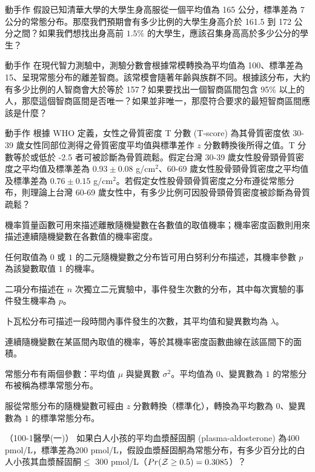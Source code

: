     \answerbox{250pt}

    \bigskip

    \begin{custom}{動手作}
        假設已知清華大學的大學生身高服從一個平均值為 165 公分，標準差為 7 公分的常態分布。那麼我們預期會有多少比例的大學生身高介於 161.5 到 172 公分之間？如果我們想找出身高前 $1.5\%$ 的大學生，應該召集身高高於多少公分的學生？
    \end{custom}
    
    \answerbox{235pt}

    \bigskip

    \begin{custom}{動手作}
        在現代智力測驗中，測驗分數會根據常模轉換為平均值為 100、標準差為 15、呈現常態分布的離差智商。該常模會隨著年齡與族群不同。根據該分布，大約有多少比例的人智商會大於等於 157？如果要找出一個智商區間包含 95\% 以上的人，那麼這個智商區間是否唯一？如果並非唯一，那麼符合要求的最短智商區間應該是什麼？
    \end{custom}
    
    \answerbox{235pt}

    \bigskip

    \begin{custom}{動手作}
        根據 WHO 定義，女性之骨質密度 T 分數 (T-score) 為其骨質密度依 30-39 歲女性同部位測得之骨質密度平均值與標準差作 $z$ 分數轉換後所得之值。T 分數等於或低於 -2.5 者可被診斷為骨質疏鬆。假定台灣 30-39 歲女性股骨頸骨質密度之平均值及標準差為 $0.93 \pm 0.08$ g/cm$^2$、60-69 歲女性股骨頸骨質密度之平均值及標準差為 $0.76 \pm 0.15$ g/cm$^2$。若假定女性股骨頸骨質密度之分布遵從常態分布，則理論上台灣 60-69 歲女性中，有多少比例可因股骨頸骨質密度被診斷為骨質疏鬆？
    \end{custom}

    \answerbox{200pt}

    \bigskip
    
    \begin{takehome}
        \item 機率質量函數可用來描述離散隨機變數在各數值的取值機率；機率密度函數則用來描述連續隨機變數在各數值的機率密度。
        \item 任何取值為 $0$ 或 $1$ 的二元隨機變數之分布皆可用白努利分布描述，其機率參數 $p$ 為該變數取值 $1$ 的機率。
        \item 二項分布描述在 $n$ 次獨立二元實驗中，事件發生次數的分布，其中每次實驗的事件發生機率為 $p$。
        \item 卜瓦松分布可描述一段時間內事件發生的次數，其平均值和變異數均為 $\lambda$。
        \item 連續隨機變數在某區間內取值的機率，等於其機率密度函數曲線在該區間下的面積。
        \item 常態分布有兩個參數：平均值 $\mu$ 與變異數 $\sigma^2$。平均值為 $0$、變異數為 $1$ 的常態分布被稱為標準常態分布。
        \item 服從常態分布的隨機變數可經由 $z$ 分數轉換（標準化），轉換為平均數為 $0$、變異數為 $1$ 的標準常態分布。
    \end{takehome}

    \begin{docexam}{（100-1醫學(一)）}
        如果白人小孩的平均血漿醛固酮 (plasma-aldosterone) 為400 pmol/L，標準差為200 pmol/L，假設血漿醛固酮為常態分布，有多少百分比的白人小孩其血漿醛固酮$\le$ 300 pmol/L（$Pr(\mathcal{Z} \ge 0.5) = 0.3085$）？
    \end{docexam}